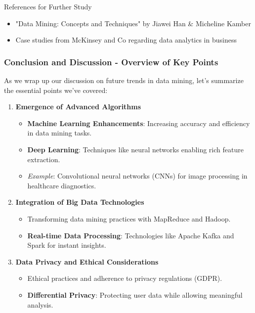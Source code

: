 \documentclass[aspectratio=169]{beamer}
\begin{document}
\begin{frame}[fragile]{References for Further Study}
    \begin{itemize}
        \item "Data Mining: Concepts and Techniques" by Jiawei Han \& Micheline Kamber
        \item Case studies from McKinsey and Co regarding data analytics in business
    \end{itemize}
\end{frame}

\begin{frame}[fragile]
    \frametitle{Conclusion and Discussion - Overview of Key Points}
    As we wrap up our discussion on future trends in data mining, let's summarize the essential points we've covered:

    \begin{enumerate}
        \item \textbf{Emergence of Advanced Algorithms}
            \begin{itemize}
                \item \textbf{Machine Learning Enhancements}: Increasing accuracy and efficiency in data mining tasks.
                \item \textbf{Deep Learning}: Techniques like neural networks enabling rich feature extraction.
                \item \textit{Example}: Convolutional neural networks (CNNs) for image processing in healthcare diagnostics.
            \end{itemize}
            
        \item \textbf{Integration of Big Data Technologies}
            \begin{itemize}
                \item Transforming data mining practices with MapReduce and Hadoop.
                \item \textbf{Real-time Data Processing}: Technologies like Apache Kafka and Spark for instant insights.
            \end{itemize}
        \item \textbf{Data Privacy and Ethical Considerations}
            \begin{itemize}
                \item Ethical practices and adherence to privacy regulations (GDPR).
                \item \textbf{Differential Privacy}: Protecting user data while allowing meaningful analysis.
            \end{itemize}
    \end{enumerate}
\end{frame}
\end{document}
